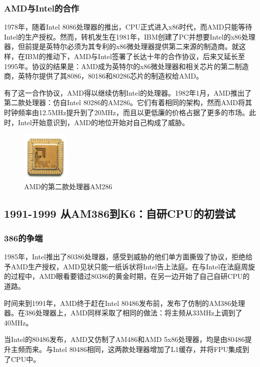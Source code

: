 \documentclass[UTF8]{ctexart}
\begin{document}
\subsubsection{AMD与Intel的合作}
1978年，随着Intel 8086处理器的推出，CPU正式进入x86时代，而AMD只能等待Intel的生产授权。然而，转机发生在1981年，IBM创建了PC并想要Intel的x86处理器，但前提是英特尔必须为其专利的x86微处理器提供第二来源的制造商。就这样，在IBM的推动下，AMD与Intel签署了长达十年的合作协议，后来又延长至1995年。协议的结果是：AMD成为英特尔的x86微处理器和相关芯片的第二制造商，英特尔提供了其8086，80186和80286芯片的制造权给AMD。

有了这一合作协议，AMD得以继续仿制Intel的处理器。1982年1月，AMD推出了第二款处理器：仿自Intel 80286的AM286。它们有着相同的架构，然而AMD将其时钟频率由12.5MHz提升到了20MHz，而且以更低廉的价格占据了更多的市场。此时，Intel开始意识到，AMD的地位开始对自己构成了威胁。

\begin{figure}[H]
    \begin{center}
        \includegraphics[width=0.2\textwidth]{figure/AM286.jpg}
        \caption{AMD的第二款处理器AM286}
    \end{center}
\end{figure}

\subsection{1991-1999 从AM386到K6：自研CPU的初尝试}

\subsubsection{386的争端}
1985年，Intel推出了80386处理器，感受到威胁的他们单方面撕毁了协议，拒绝给予AMD生产授权，AMD见状只能一纸诉状将Intel告上法庭。在与Intel在法庭周旋的过程中，AMD眼看要错过80386的黄金时期，在另一边开始了自己自研CPU的道路。

时间来到1991年，AMD终于赶在Intel 80486发布前，发布了仿制的AM386处理器。在386处理器上，AMD同样采取了相同的做法：将主频从33MHz上调到了40MHz。

当Intel的80486发布，AMD又仿制了AM486和AMD 5x86处理器，均是由80486提升主频而来。与Intel 80486相同，这两款处理器增加了L1缓存，并将FPU集成到了CPU中。
\end{document}
